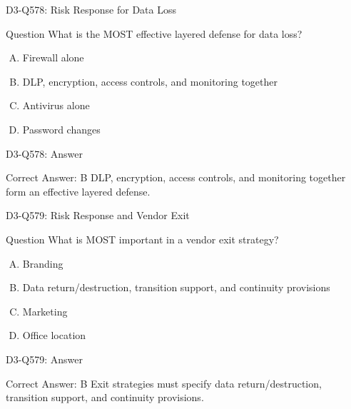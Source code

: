 \documentclass{beamer}
\begin{document}
	\begin{frame}{D3-Q578: Risk Response for Data Loss}
		\begin{block}{Question}
			What is the MOST effective layered defense for data loss?
		\end{block}
		\begin{enumerate}[(A)]
			\item Firewall alone
			\item DLP, encryption, access controls, and monitoring together
			\item Antivirus alone
			\item Password changes
		\end{enumerate}
	\end{frame}
	\begin{frame}{D3-Q578: Answer}
		\begin{block}{Correct Answer: B}
			DLP, encryption, access controls, and monitoring together form an effective layered defense.
		\end{block}
	\end{frame}
	
	\begin{frame}{D3-Q579: Risk Response and Vendor Exit}
		\begin{block}{Question}
			What is MOST important in a vendor exit strategy?
		\end{block}
		\begin{enumerate}[(A)]
			\item Branding
			\item Data return/destruction, transition support, and continuity provisions
			\item Marketing
			\item Office location
		\end{enumerate}
	\end{frame}
	\begin{frame}{D3-Q579: Answer}
		\begin{block}{Correct Answer: B}
			Exit strategies must specify data return/destruction, transition support, and continuity provisions.
		\end{block}
	\end{frame}
	
\end{document}
